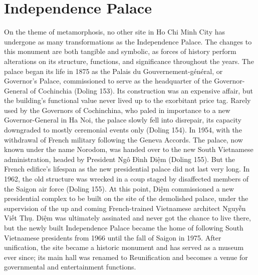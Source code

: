 \section{Independence Palace}
\vi

On the theme of metamorphosis, no other site in Ho Chi Minh City has undergone as many transformations as the Independence Palace. The changes to this monument are both tangible and symbolic, as forces of history perform alterations on its structure, functions, and significance throughout the years. The palace began its life in 1875 as the Palais du Gouvernement-général, or Governor’s Palace, commissioned to serve as the headquarter of the Governor-General of Cochinchia (Doling 153). Its construction was an expensive affair, but the building’s functional value never lived up to the exorbitant price tag. Rarely used by the Governors of Cochinchina, who paled in importance to a new Governor-General in Ha Noi, the palace slowly fell into disrepair, its capacity downgraded to mostly ceremonial events only (Doling 154). In 1954, with the withdrawal of French military following the Geneva Accords. The palace, now known under the name Norodom, was handed over to the new South Vietnamese administration, headed by President Ngô Đình Diệm (Doling 155). But the French edifice’s lifespan as the new presidential palace did not last very long. In 1962, the old structure was wrecked in a coup staged by disaffected members of the Saigon air force (Doling 155). At this point, Diệm commissioned a new presidential complex to be built on the site of the demolished palace, under the supervision of the up and coming French-trained Vietnamese architect Nguyễn Viết Thụ. Diệm was ultimately assinated and never got the chance to live there, but the newly built Independence Palace became the home of following South Vietnamese presidents from 1966 until the fall of Saigon in 1975. After unification, the site became a historic monument and has served as a museum ever since; its main hall was renamed to Reunification and becomes a venue for governmental and entertainment functions.

